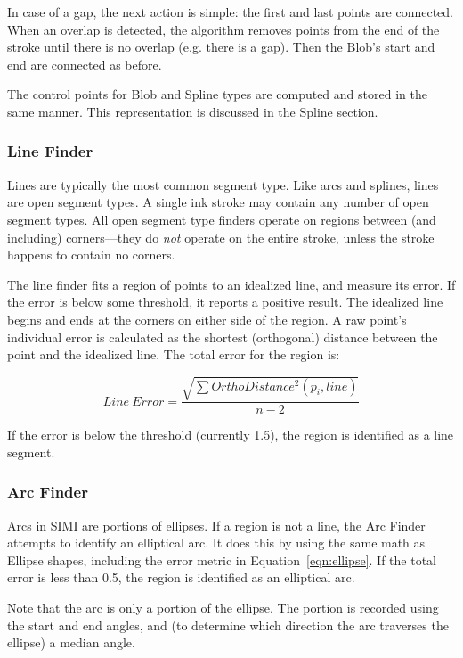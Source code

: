 In case of a gap, the next action is simple: the first and last points
are connected. When an overlap is detected, the algorithm removes
points from the end of the stroke until there is no overlap
(e.g. there is a gap). Then the Blob's start and end are connected as
before.

The control points for Blob and Spline types are computed and stored
in the same manner. This representation is discussed in the Spline
section.

\subsubsection{Line Finder}

Lines are typically the most common segment type. Like arcs and
splines, lines are open segment types. A single ink stroke may contain
any number of open segment types. All open segment type finders
operate on regions between (and including) corners---they do
\textit{not} operate on the entire stroke, unless the stroke happens
to contain no corners.

The line finder fits a region of points to an idealized line, and
measure its error. If the error is below some threshold, it reports a
positive result. The idealized line begins and ends at the corners on
either side of the region. A raw point's individual error is
calculated as the shortest (orthogonal) distance between the point and
the idealized line. The total error for the region is:

\begin{equation}
Line\:Error = \dfrac{\sqrt{\sum OrthoDistance^2(p_i, line)}}{n-2}
\end{equation}

If the error is below the threshold (currently 1.5), the region is
identified as a line segment.

\subsubsection{Arc Finder}

Arcs in SIMI are portions of ellipses. If a region is not a line, the
Arc Finder attempts to identify an elliptical arc. It does this by
using the same math as Ellipse shapes, including the error metric in
Equation~\ref{eqn:ellipse}. If the total error is less than 0.5, the
region is identified as an elliptical arc.

Note that the arc is only a portion of the ellipse. The portion is
recorded using the start and end angles, and (to determine which
direction the arc traverses the ellipse) a median angle.

